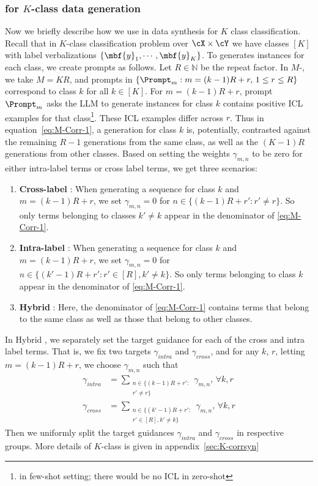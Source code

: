 \subsubsection{\corrsyn{} for $K$-class data generation}
Now we briefly describe how we use \corrsyn{} in data synthesis for $K$ class classification. Recall that in $K$-class classification problem over $\cX\times\cY$ we have classes $[K]$ with label verbalizations $\{\mbf{y}_1,\cdots,\mbf{y}_K\}$. To generates instances for each class, we create prompts as follows. Let $R\in\mathbb{N}$ be the repeat factor. In $M$-\corrsyn{}, we take $M=KR$, and prompts in $\{\Prompt_{m}:m=(k-1)R+r,\, 1\leq r\leq R\}$ correspond to class $k$ for all $k\in[K]$. For $m=(k-1)R+r$, prompt $\Prompt_{m}$ asks the LLM to generate instances for class $k$ contains positive ICL examples for that class\footnote{in few-shot setting; there would be no ICL in zero-shot}. These ICL examples differ across $r$. Thus in equation~\eqref{eq:M-Corr-1}, a generation for class $k$ is, potentially, contrasted against the remaining $R-1$ generations from the same class, as well as the $(K-1)R$ generations from other classes. Based on setting the weights $\gamma_{m,n}$ to be zero for either intra-label terms or cross label terms, we get three scenarios:
\begin{enumerate}
    \item \textbf{Cross-label \corrsyn{}}: When generating a sequence for class $k$ and $m=(k-1)R+r$, we set $\gamma_{m,n}=0$ for $n\in\{(k-1)R+r':r'\neq r\}$. So only terms belonging to classes $k'\neq k$ appear in the denominator of \eqref{eq:M-Corr-1}.
    \item \textbf{Intra-label \corrsyn{}}: When generating a sequence for class $k$ and $m=(k-1)R+r$, we set $\gamma_{m,n}=0$ for $n\in\{(k'-1)R+r':r'\in[R],k'\neq k\}$. So only terms belonging to class $k$ appear in the denominator of \eqref{eq:M-Corr-1}.
    \item \textbf{Hybrid \corrsyn{}}: Here, the denominator of \eqref{eq:M-Corr-1} contains terms that belong to the same class as well as those that belong to other classes.
\end{enumerate}

In Hybrid \corrsyn{}, we separately set the target guidance for each of the cross and intra label terms. That is, we fix two targets $\gamma_{intra}$ and $\gamma_{cross}$, and for any $k$, $r$, letting $m=(k-1)R+r$, we choose $\gamma_{m,n}$ such that
\begin{align}
    \gamma_{intra}&=\sum_{\substack{n\in\{(k-1)R+r':\\r'\neq r\}}}\gamma_{m,n},\,\forall k,r\\
    \gamma_{cross}&=\sum_{\substack{n\in\{(k'-1)R+r':\\ r'\in[R],k'\neq k\}}}\gamma_{m,n},\,\forall k,r
\end{align}
Then we uniformly split the target guidances $\gamma_{intra}$ and $\gamma_{cross}$ in respective groups. More details of $K$-class \corrsyn{} is given in appendix~\ref{sec:K-corrsyn}



